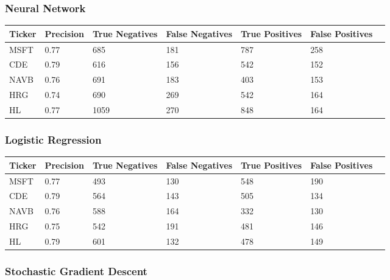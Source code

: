 \subsubsection{Neural Network}

\begin{center}
    \begin{tabular}{ | l | l | l | | l | l | l | p{5cm} |}
    \hline
    Ticker & Precision & True Negatives & False Negatives & True Positives & False Positives \\ \hline
    MSFT & 0.77 & 685 & 181 & 787 & 258 \\ \hline
    CDE & 0.79 & 616 & 156 & 542 & 152 \\ \hline
    NAVB & 0.76 & 691 & 183 & 403 & 153 \\ \hline
    HRG & 0.74 & 690 & 269 & 542 & 164 \\ \hline
    HL & 0.77 & 1059 & 270 & 848 & 164 \\
    \hline
    \end{tabular}
\end{center}

\subsubsection{Logistic Regression}

\begin{center}
    \begin{tabular}{ | l | l | l | | l | l | l | p{5cm} |}
    \hline
    Ticker & Precision & True Negatives & False Negatives & True Positives & False Positives \\ \hline
    MSFT & 0.77 & 493 & 130 & 548 & 190 \\ \hline
    CDE & 0.79 & 564 & 143 & 505 & 134 \\ \hline
    NAVB & 0.76 & 588 & 164 & 332 & 130 \\ \hline
    HRG & 0.75 & 542 & 191 & 481 & 146 \\ \hline
    HL & 0.79 & 601 & 132 & 478 & 149 \\
    \hline
    \end{tabular}
\end{center}

\subsubsection{Stochastic Gradient Descent}

